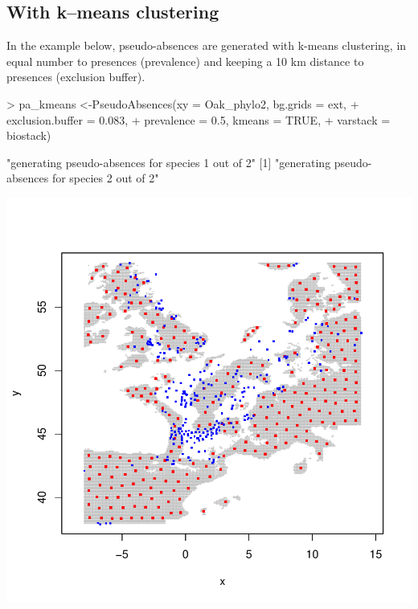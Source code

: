 \documentclass[10pt,a4paper]{report}
\begin{document}
\subsection{With k--means clustering}

In the example below, pseudo-absences are generated with k-means clustering, in equal number to presences (prevalence) and keeping a 10 km distance to presences (exclusion buffer).

\begin{Schunk}
\begin{Sinput}
> pa_kmeans <-PseudoAbsences(xy = Oak_phylo2, bg.grids = ext, 
+                            exclusion.buffer = 0.083, 
+                            prevalence = 0.5, kmeans = TRUE, 
+                            varstack = biostack)
\end{Sinput}
\begin{Soutput}
[1] "generating pseudo-absences for species 1 out of 2"
[1] "generating pseudo-absences for species 2 out of 2"
\end{Soutput}
\end{Schunk}
\includegraphics{mopa-mopa10}
\end{document}
